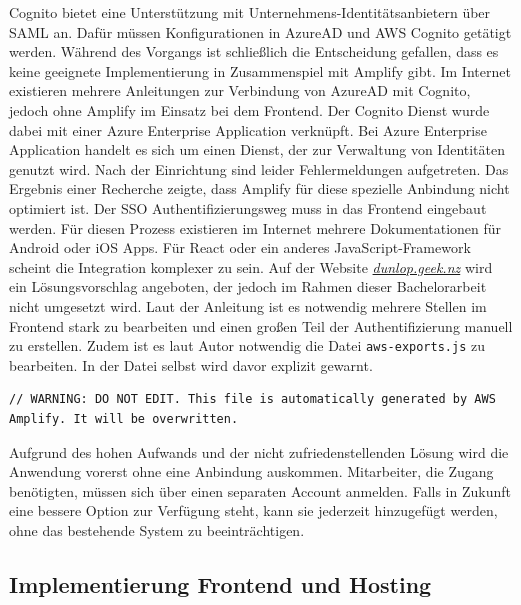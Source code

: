 Cognito bietet eine Unterstützung mit Unternehmens-Identitätsanbietern über SAML an.
Dafür müssen Konfigurationen in AzureAD und AWS Cognito getätigt werden.
Während des Vorgangs ist schließlich die Entscheidung gefallen, dass es keine geeignete Implementierung in Zusammenspiel mit Amplify gibt.
Im Internet existieren mehrere Anleitungen zur Verbindung von AzureAD mit Cognito, jedoch ohne Amplify im Einsatz bei dem Frontend.
Der Cognito Dienst wurde dabei mit einer \glqq Azure Enterprise Application\grqq{} verknüpft.
Bei \glqq Azure Enterprise Application\grqq{} handelt es sich um einen Dienst, der zur Verwaltung von Identitäten genutzt wird.
Nach der Einrichtung sind leider Fehlermeldungen aufgetreten.
Das Ergebnis einer Recherche zeigte, dass Amplify für diese spezielle Anbindung nicht optimiert ist.
Der SSO Authentifizierungsweg muss in das Frontend eingebaut werden.
Für diesen Prozess existieren im Internet mehrere Dokumentationen für Android oder iOS Apps.
Für React oder ein anderes JavaScript-Framework scheint die Integration komplexer zu sein.
Auf der Website \textit{\href{https://dunlop.geek.nz/aws-cognito-azure-ad-react-amplify/}{dunlop.geek.nz}} wird ein Lösungsvorschlag angeboten, der jedoch im Rahmen dieser Bachelorarbeit nicht umgesetzt wird.
Laut der Anleitung ist es notwendig mehrere Stellen im Frontend stark zu bearbeiten und einen großen Teil der Authentifizierung manuell zu erstellen.
Zudem ist es laut Autor notwendig die Datei \verb+aws-exports.js+ zu bearbeiten.
In der Datei selbst wird davor explizit gewarnt.

\begin{lstlisting}[basicstyle=\ttfamily\small, breaklines=true , frame = single, backgroundcolor=\color{flashwhite}, caption={Auszug aws-exports.js} ]
// WARNING: DO NOT EDIT. This file is automatically generated by AWS Amplify. It will be overwritten.
\end{lstlisting}

Aufgrund des hohen Aufwands und der nicht zufriedenstellenden Lösung wird die Anwendung vorerst ohne eine Anbindung auskommen.
Mitarbeiter, die Zugang benötigten, müssen sich über einen separaten Account anmelden.
Falls in Zukunft eine bessere Option zur Verfügung steht, kann sie jederzeit hinzugefügt werden, ohne das bestehende System zu beeinträchtigen.


\subsection{Implementierung Frontend und Hosting}

